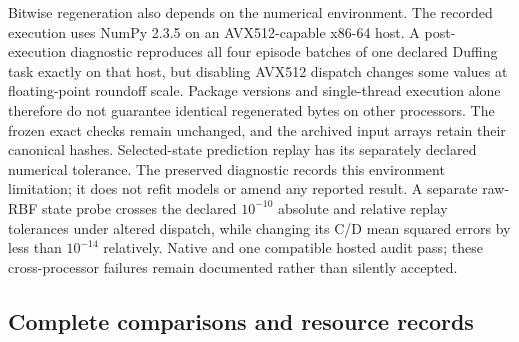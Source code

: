 Bitwise regeneration also depends on the numerical environment. The
recorded execution uses NumPy 2.3.5 on an AVX512-capable x86-64 host.
A post-execution diagnostic reproduces all four episode batches of one
declared Duffing task exactly on that host, but disabling AVX512 dispatch
changes some values at floating-point roundoff scale. Package versions
and single-thread execution alone therefore do not guarantee identical
regenerated bytes on other processors. The frozen exact checks remain
unchanged, and the archived input arrays retain their canonical hashes.
Selected-state prediction replay has its separately declared numerical
tolerance. The preserved diagnostic records this environment limitation;
it does not refit models or amend any reported result.
A separate raw-RBF state probe crosses the declared $10^{-10}$ absolute
and relative replay tolerances under altered dispatch, while changing
its C/D mean squared errors by less than $10^{-14}$ relatively.
Native and one compatible hosted audit pass; these cross-processor
failures remain documented rather than silently accepted.


\subsection{Complete comparisons and resource records}

\begin{table}[!htbp]
\centering\small
\setlength{\tabcolsep}{4pt}
\caption{The complete 18-comparison family for reconstruction-trained
KAHM. Gain is $100(\overline L_{\rm control}-\overline L_{\rm KAHM})/
\overline L_{\rm control}$. Intervals are absolute paired MSE differences,
not percentage intervals; their positive direction favors KAHM.}
\label{tab:direct-primary}

\end{table}

\begin{table}[p]
\centering\small
\setlength{\tabcolsep}{5pt}
\caption{Collection-specific scaled MSE for every procedure. Each
available collection weights its selected series equally. All three
A-selected rideshare series have no complete B windows, so their entries
and the planned four-collection aggregate are undefined.}
\label{tab:direct-natural}

\end{table}

\begin{table}[p]
\centering\small
\setlength{\tabcolsep}{4pt}
\caption{Measured complete procedure dependencies and selected model
state. Means weight the 36 synthetic tasks equally or the seven available
natural tasks equally. Natural loss tables instead weight their three
available collections equally. Times include selected-state packing and
serialization, and policy search costs count shared dependencies once.
State bytes are not peak resident memory.}
\label{tab:direct-cost}

\end{table}

